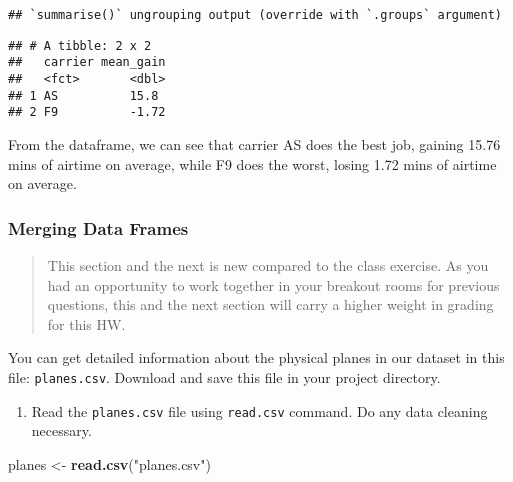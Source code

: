 \documentclass[
]{article}
\newenvironment{Shaded}{\begin{snugshade}}{\end{snugshade}}
\newcommand{\KeywordTok}[1]{\textcolor[rgb]{0.13,0.29,0.53}{\textbf{#1}}}
\newcommand{\NormalTok}[1]{#1}
\newcommand{\StringTok}[1]{\textcolor[rgb]{0.31,0.60,0.02}{#1}}
\providecommand{\tightlist}{%
  \setlength{\itemsep}{0pt}\setlength{\parskip}{0pt}}
\begin{document}
\begin{verbatim}
## `summarise()` ungrouping output (override with `.groups` argument)
\end{verbatim}

\begin{verbatim}
## # A tibble: 2 x 2
##   carrier mean_gain
##   <fct>       <dbl>
## 1 AS          15.8 
## 2 F9          -1.72
\end{verbatim}

From the dataframe, we can see that carrier AS does the best job,
gaining 15.76 mins of airtime on average, while F9 does the worst,
losing 1.72 mins of airtime on average.

\hypertarget{merging-data-frames}{%
\subsubsection{Merging Data Frames}\label{merging-data-frames}}

\begin{quote}
This section and the next is new compared to the class exercise. As you
had an opportunity to work together in your breakout rooms for previous
questions, this and the next section will carry a higher weight in
grading for this HW.
\end{quote}

You can get detailed information about the physical planes in our
dataset in this file: \texttt{planes.csv}. Download and save this file
in your project directory.

\begin{enumerate}
\def\labelenumi{\alph{enumi})}
\tightlist
\item
  Read the \texttt{planes.csv} file using \texttt{read.csv} command. Do
  any data cleaning necessary.
\end{enumerate}

\begin{Shaded}
\begin{Highlighting}[]
\NormalTok{planes <-}\StringTok{ }\KeywordTok{read.csv}\NormalTok{(}\StringTok{"planes.csv"}\NormalTok{)}
\end{Highlighting}
\end{Shaded}
\end{document}

